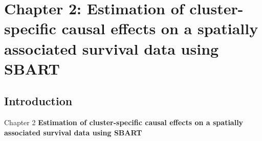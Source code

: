 \documentclass{beamer}
\begin{document}








 
  


 





  





\section{Chapter 2: Estimation of cluster-specific causal effects on a  spatially associated survival data using SBART}

\subsection{Introduction}
\begin{frame}{Chapter 2}
    \textbf{Estimation of cluster-specific causal effects on a  spatially associated survival data using SBART}
\end{frame}
\end{document}
